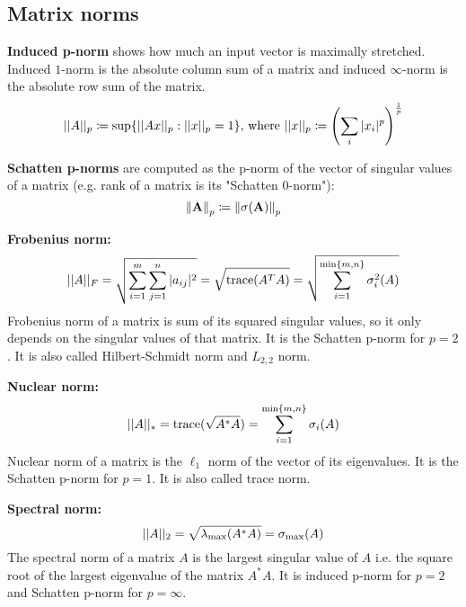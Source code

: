 \documentclass[12pt]{article}
\begin{document}
\subsection{Matrix norms}
\par \textbf{Induced p-norm} shows how much an input vector is maximally stretched. Induced $1$-norm is the absolute column sum of a matrix and induced $\infty$-norm is the absolute row sum of the matrix.
\[ ||A||_p \coloneqq \sup\{ ||Ax||_p : ||x||_p = 1 \} \text{, where } ||x||_p \coloneqq \left( \sum_i |x_i|^p \right)^{\frac{1}{p}} \]
\par \textbf{Schatten p-norms} are computed as the p-norm of the vector of singular values of a matrix (e.g. rank of a matrix is its "Schatten 0-norm"):
\[ \left\lVert\mathbf{A}\right\rVert_p \coloneqq \left\lVert\sigma(\mathbf{A})\right\rVert_p \]
\ulb
\item \textbf{Frobenius norm:}
\[ ||A||_F = \sqrt{\sum_{i=1}^m \sum_{j=1}^n |a_{ij}|^2 } = \sqrt{\text{trace}(A^T A)} = \sqrt{\sum_{i=1}^{\min\{m,n\}} \sigma_i^2(A)} \]
Frobenius norm of a matrix is sum of its squared singular values, so it only depends on the singular values of that matrix. It is the Schatten p-norm for $p=2$. It is also called Hilbert-Schmidt norm and $L_{2,2}$ norm.
\item \textbf{Nuclear norm:}
\[ ||A||_* = \text{trace}(\sqrt{A^*A}) = \sum_{i=1}^{\min\{m,n\}} \sigma_i(A) \]
Nuclear norm of a matrix is the $\ell_1$ norm of the vector of its eigenvalues. It is the Schatten p-norm for $p=1$. It is also called trace norm.
\item \textbf{Spectral norm:}
\[ ||A||_2 = \sqrt{\lambda_{\max}(A^*A)} = \sigma_{\max}(A) \]
The spectral norm of a matrix $A$ is the largest singular value of $A$ i.e. the square root of the largest eigenvalue of the matrix $A^{*}A$. It is induced p-norm for $p=2$ and Schatten p-norm for $p=\infty$.
\ule
\end{document}
